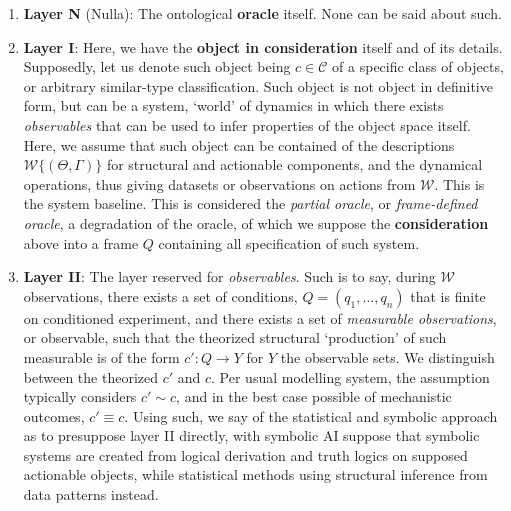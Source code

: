 \begin{enumerate}
    \item \textbf{Layer \textsf{N}} (Nulla): The ontological \textbf{oracle} itself. None can be said about such.
    \item \textbf{Layer I}: Here, we have the \textbf{object in consideration} itself and of its details. Supposedly, let us denote such object being $c\in\mathcal{C}$ of a specific class of objects, or arbitrary similar-type classification. Such object is not object in definitive form, but can be a system, `world' of dynamics in which there exists \textit{observables} that can be used to infer properties of the object space itself. Here, we assume that such object can be contained of the descriptions $\mathcal{W}\{(\Theta, \Gamma)\}$ for structural and actionable components, and the dynamical operations, thus giving datasets or observations on actions from $\mathcal{W}$. This is the system baseline. This is considered the \textit{partial oracle}, or \textit{frame-defined oracle}, a degradation of the oracle, of which we suppose the \textbf{consideration} above into a frame $Q$ containing all specification of such system.
    \item \textbf{Layer II}: The layer reserved for \textit{observables}. Such is to say, during $\mathcal{W}$ observations, there exists a set of conditions, $Q=(q_{1},\dots,q_{n})$ that is finite on conditioned experiment, and there exists a set of \textit{measurable observations}, or observable, such that the theorized structural `production' of such measurable is of the form $c':Q\to Y$ for $Y$ the observable sets. We distinguish between the theorized $c'$ and $c$. Per usual modelling system, the assumption typically considers $c'\sim c$, and in the best case possible of mechanistic outcomes, $c'\equiv c$. Using such, we say of the statistical and symbolic approach as to presuppose layer II directly, with symbolic AI suppose that symbolic systems are created from logical derivation and truth logics on supposed actionable objects, while statistical methods using structural inference from data patterns instead. 

\end{enumerate}
